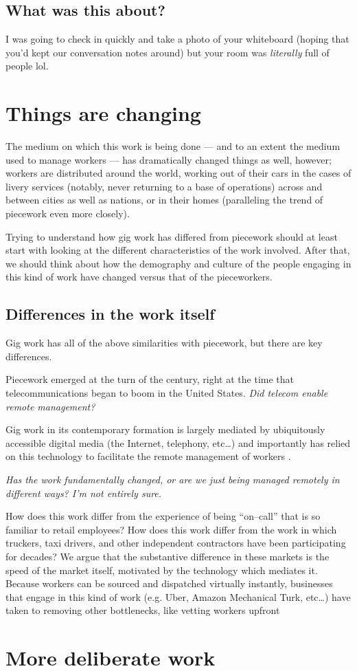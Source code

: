 \documentclass{sigchi}
\begin{document}
\subsection{What was this about?}
I was going to check in quickly and take a photo of your whiteboard
(hoping that you'd kept our conversation notes around)
but your room was \textit{literally} full of people lol.


\section{Things are changing}
The medium on which this work is being done
--- and to an extent the medium used to manage workers ---
has dramatically changed things as well, however;
workers are distributed around the world,
working out of their cars in the cases of livery services
(notably, never returning to a base of operations)
across and between cities as well as nations,
or in their homes
(paralleling the trend of piecework even more closely).

Trying to understand how gig work has differed from piecework should at least
start with looking at the different characteristics of the work involved.
After that, we should think about how
the demography and culture of the people engaging in this kind of work
have changed versus that of the pieceworkers.

\subsection{Differences in the work itself}
Gig work has all of the above similarities with piecework,
but there are key differences.

Piecework emerged at the turn of the  century,
right at the time that telecommunications began to boom in the United States. %
\textit{Did telecom enable remote management?}

Gig work in its contemporary formation is largely mediated by
ubiquitously accessible digital media
(the Internet, telephony, etc\dots)
and importantly has relied on this technology to facilitate the remote management of workers
\cite{uberAlgorithm}.

\textit{Has the work fundamentally changed,
or are we just being managed remotely in different ways?
I'm not entirely sure.}

How does this work differ from the experience of being ``on--call'' that is so familiar to retail employees?
How does this work differ from the work in which truckers, taxi drivers, and other
independent contractors have been participating for decades?
We argue that the substantive difference in these markets is the speed of the market itself,
motivated by the technology which mediates it.
Because workers can be sourced and dispatched virtually instantly,
businesses that engage in this kind of work
(e.g. Uber, Amazon Mechanical Turk, etc\dots)
have taken to removing other bottlenecks,
like vetting workers upfront


\section{More deliberate work}

\balance{}
\printbibliography
\end{document}
